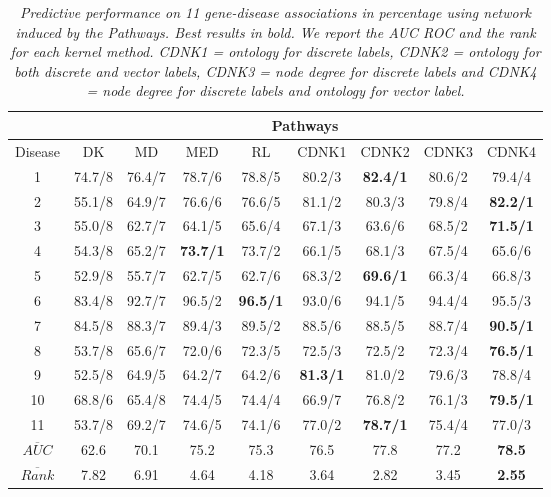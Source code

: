 \documentclass[review]{elsarticle}
\begin{document}
\begin{table}
\caption{\textit {Predictive performance on 11 gene-disease associations in percentage using network induced by the Pathways. Best results in bold. We report the AUC ROC and the rank for each kernel method.  CDNK1 = ontology for discrete labels, CDNK2 = ontology for both discrete and vector labels, CDNK3 = node degree for discrete labels and CDNK4 = node degree for discrete labels and ontology for vector label.}}
\vspace*{5pt}
\centering
\setlength{\tabcolsep}{1mm}
\begin{tabular}{|c|c|c|c|c|c|c|c|c|}
\hline
         & \multicolumn{8}{c|}{\textbf{Pathways}} \\
 \hline
Disease & DK & MD & MED & RL & CDNK1 & CDNK2 & CDNK3 & CDNK4 \\

 \hline
1 & 74.7/8 & 76.4/7 & 78.7/6 & 78.8/5 & 80.2/3 & \textbf{82.4/1} & 80.6/2 & 79.4/4 \\
2 & 55.1/8 & 64.9/7 & 76.6/6 & 76.6/5 & 81.1/2 & 80.3/3 & 79.8/4 & \textbf{82.2/1} \\
3 & 55.0/8 & 62.7/7 & 64.1/5 & 65.6/4 & 67.1/3 & 63.6/6 & 68.5/2 & \textbf{71.5/1} \\
4 & 54.3/8 & 65.2/7 & \textbf{73.7/1} & 73.7/2 & 66.1/5 & 68.1/3 & 67.5/4 & 65.6/6 \\
5 & 52.9/8 & 55.7/7 & 62.7/5 & 62.7/6 & 68.3/2 & \textbf{69.6/1} & 66.3/4 & 66.8/3 \\
6 & 83.4/8 & 92.7/7 & 96.5/2 & \textbf{96.5/1} & 93.0/6 & 94.1/5 & 94.4/4 & 95.5/3 \\
7 & 84.5/8 & 88.3/7 & 89.4/3 & 89.5/2 & 88.5/6 & 88.5/5 & 88.7/4 & \textbf{90.5/1} \\
8 & 53.7/8 & 65.6/7 & 72.0/6 & 72.3/5 & 72.5/3 & 72.5/2 & 72.3/4 & \textbf{76.5/1} \\
9 & 52.5/8 & 64.9/5 & 64.2/7 & 64.2/6 & \textbf{81.3/1} & 81.0/2 & 79.6/3 & 78.8/4 \\
10 & 68.8/6 & 65.4/8 & 74.4/5 & 74.4/4 & 66.9/7 & 76.8/2 & 76.1/3 & \textbf{79.5/1} \\
11 & 53.7/8 & 69.2/7 & 74.6/5 & 74.1/6 & 77.0/2 & \textbf{78.7/1} & 75.4/4 & 77.0/3 \\
\hline
$\overline{AUC}$ & 62.6 & 70.1 & 75.2 & 75.3 & 76.5 & 77.8 & 77.2 & \textbf{78.5} \\
$\overline{Rank}$ & 7.82 & 6.91 & 4.64 & 4.18 & 3.64 & 2.82 & 3.45 & \textbf{2.55} \\
 \hline 
\end{tabular}
\label{table_pathways}
\end{table}
\end{document}
